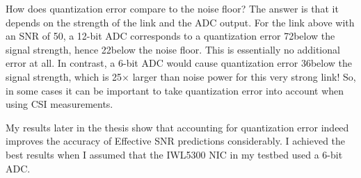 How does quantization error compare to the noise floor? The answer is that it depends on the strength of the link and the ADC output. For the link above with an SNR of 50\dB, a 12-bit ADC corresponds to a quantization error 72\dB below the signal strength, hence 22\dB below the noise floor. This is essentially no additional error at all. In contrast, a 6-bit ADC would cause quantization error 36\dB below the signal strength, which is 25$\times$ larger than noise power for this very strong link! So, in some cases it can be important to take quantization error into account when using CSI measurements.

My results later in the thesis show that accounting for quantization error indeed improves the accuracy of Effective SNR predictions considerably. I achieved the best results when I assumed that the IWL5300 NIC in my testbed used a 6-bit ADC.

%
%

